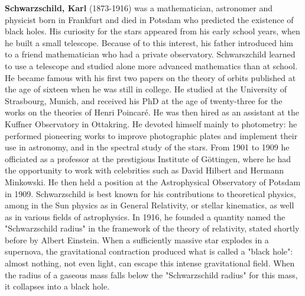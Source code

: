 \textbf{Schwarzschild, Karl} (1873-1916) was a mathematician, astronomer and physicist born in Frankfurt and died in Potsdam who predicted the existence of black holes. His curiosity for the stars appeared from his early school years, when he built a small telescope. Because of to this interest, his father introduced him to a friend mathematician who had a private observatory. Schwarszchild learned to use a telescope and studied alone more advanced mathematics than at school. He became famous with his first two papers on the theory of orbits published at the age of sixteen when he was still in college. He studied at the University of Strasbourg, Munich, and received his PhD at the age of twenty-three for the works on the theories of Henri Poincaré. He was then hired as an assistant at the Kuffner Observatory in Ottakring. He devoted himself mainly to photometry: he performed pioneering works to improve photographic plates and implement their use in astronomy, and in the spectral study of the stars. From 1901 to 1909 he officiated as a professor at the prestigious Institute of Göttingen, where he had the opportunity to work with celebrities such as David Hilbert and Hermann Minkowski. He then held a position at the Astrophysical Observatory of Potsdam in 1909. Schwarzschild is best known for his contributions to theoretical physics, among in the Sun physics as in General Relativity, or stellar kinematics, as well as in various fields of astrophysics. In 1916, he founded a quantity named the "Schwarzschild radius" in the framework of the theory of relativity, stated shortly before by Albert Einstein. When a sufficiently massive star explodes in a supernova, the gravitational contraction produced what is called a "black hole": almost nothing, not even light, can escape this intense gravitational field. When the radius of a gaseous mass falls below the "Schwarzschild radius" for this mass, it collapses into a black hole.

